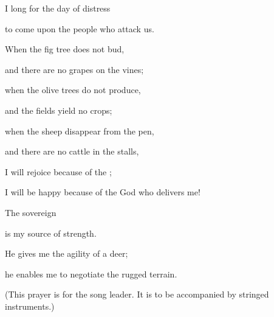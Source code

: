 {\par }{\Q I long
for the day
of distress
\par }{\Q to come upon
the people
who attack us.
\par }{\Q {}When
the fig tree
does not
bud,
\par }{\Q and there are no
grapes
on the vines;
\par }{\Q when the olive trees
do not produce,
\par }{\Q and the fields
yield
no
crops;
\par }{\Q when the sheep
disappear
from the pen,
\par }{\Q and there are no
cattle
in the stalls,
\par }{\Q {}I
will rejoice
because of the
{};
\par }{\Q I will be happy
because of the God
who delivers me!
\par }{\Q {}The sovereign

{}
is my source of strength.
\par }{\Q He gives
me the agility
of a deer;
\par }{\Q he enables me to negotiate
the rugged terrain.
\par }{\PP (This prayer is for the song leader.
It is to be accompanied by stringed instruments.)
\par }